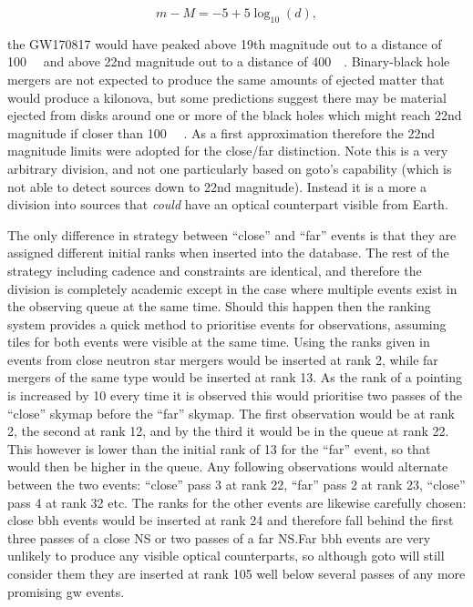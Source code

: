 \begin{colsection}
\begin{colsection}
\begin{equation}
    m-M = -5 +5\log_{10}(d),
    \label{eq:absolute_magnitude}
\end{equation}

the GW170817 would have peaked above 19th magnitude out to a distance of \SI{100}{\mega\parsec} and above 22nd magnitude out to a distance of \SI{400}{\mega\parsec}. Binary-black hole mergers are not expected to produce the same amounts of ejected matter that would produce a kilonova, but some predictions suggest there may be material ejected from disks around one or more of the black holes which might reach 22nd magnitude if closer than \SI{100}{\mega\parsec} \citep{BBH_EM, BBH_Gompertz}. As a first approximation therefore the 22nd magnitude limits were adopted for the close/far distinction. Note this is a very arbitrary division, and not one particularly based on \gls{goto}'s capability (which is not able to detect sources down to 22nd magnitude). Instead it is a more a division into sources that \textit{could} have an optical counterpart visible from Earth.

The only difference in strategy between ``close'' and ``far'' events is that they are assigned different initial ranks when inserted into the database. The rest of the strategy including cadence and constraints are identical, and therefore the division is completely academic except in the case where multiple events exist in the observing queue at the same time. Should this happen then the ranking system provides a quick method to prioritise events for observations, assuming tiles for both events were visible at the same time. Using the ranks given in  events from close neutron star mergers would be inserted at rank 2, while far mergers of the same type would be inserted at rank 13. As the rank of a pointing is increased by 10 every time it is observed this would prioritise two passes of the ``close'' skymap before the ``far'' skymap. The first observation would be at rank 2, the second at rank 12, and by the third it would be in the queue at rank 22. This however is lower than the initial rank of 13 for the ``far'' event, so that would then be higher in the queue. Any following observations would alternate between the two events: ``close'' pass 3 at rank 22, ``far'' pass 2 at rank 23, ``close'' pass 4 at rank 32 etc. The ranks for the other events are likewise carefully chosen: close \gls{bbh} events would be inserted at rank 24 and therefore fall behind the first three passes of a close NS or two passes of a far NS.\@ Far \gls{bbh} events are very unlikely to produce any visible optical counterparts, so although \gls{goto} will still consider them they are inserted at rank 105 well below several passes of any more promising \gls{gw} events.


\end{colsection}
\end{colsection}
